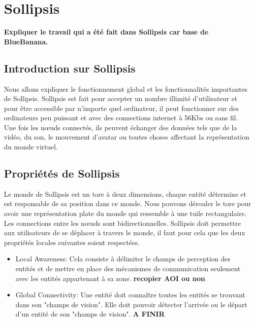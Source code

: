\section{Sollipsis}
	\textbf{Expliquer le travail qui a été fait dans Sollipsis car base de BlueBanana. }
	\subsection{Introduction sur Sollipsis} 
	Nous allons expliquer le fonctionnement global et les fonctionnalités importantes de Sollipsis. Sollipsis est fait pour accepter un nombre illimité d'utilisateur et pour être accessible par n'importe quel ordinateur, il peut fonctionner sur des ordinateurs peu puissant et avec des connections internet à 56Kbs ou sans fil. Une fois les nœuds connectés, ils peuvent échanger des données tels que de la vidéo, du son, le mouvement d'avatar ou toutes choses affectant la représentation du monde virtuel. \\
	\subsection{Propriétés de Sollipsis}
	Le monde de Sollipsis est un tore à deux dimensions, chaque entité détermine et est responsable de sa position dans ce monde. Nous pouvons dérouler le tore pour avoir une représentation plate du monde qui ressemble à une tuile rectangulaire. Les connections entre les nœuds sont bidirectionnelles. Sollipsis doit permettre aux utilisateurs de se déplacer à travers le monde, il faut pour cela que les deux propriétés locales suivantes soient respectées.
	\begin{itemize}
		\item Local Awareness:
		Cela consiste à délimiter le champs de perception des entités et de mettre en place des mécanismes de communication seulement avec les entités appartenant à sa zone. \textbf{recopier AOI ou non }
		\item Global Connectivity:
		Une entité doit connaître toutes les entités se trouvant dans son "champs de vision". Elle doit pouvoir détecter l'arrivée ou le départ d'un entité de son "champs de vision". \textbf{A FINIR}
	\end{itemize} 
